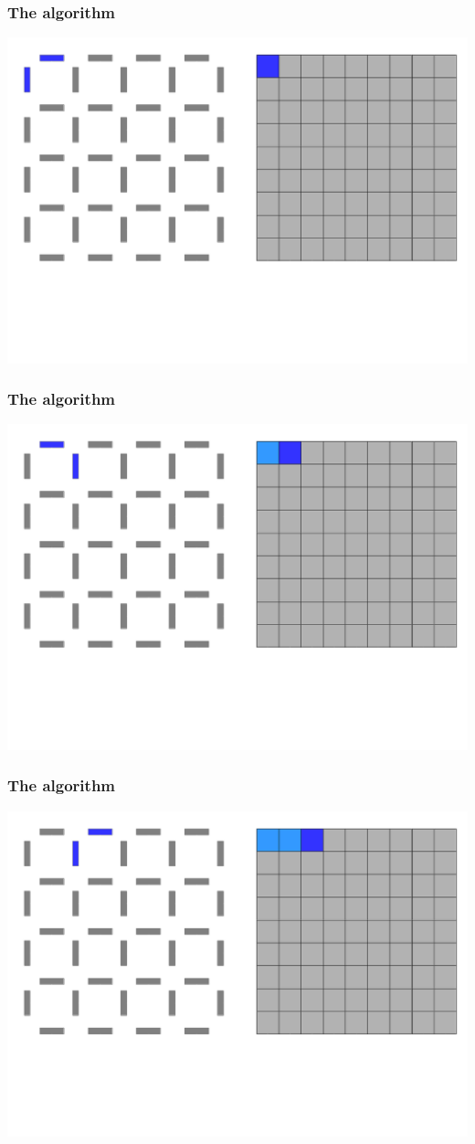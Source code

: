 \documentclass{beamer}
\begin{document}
\begin{frame}
    \frametitle{The algorithm}
    \begin{center}
        \includegraphics[width=.8\textwidth]{img/grid1.png}
    \end{center}
\end{frame}
\begin{frame}
    \frametitle{The algorithm}
    \begin{center}
        \includegraphics[width=.8\textwidth]{img/grid2.png}
    \end{center}
\end{frame}
\begin{frame}
    \frametitle{The algorithm}
    \begin{center}
        \includegraphics[width=.8\textwidth]{img/grid3.png}
    \end{center}
\end{frame}
\end{document}
